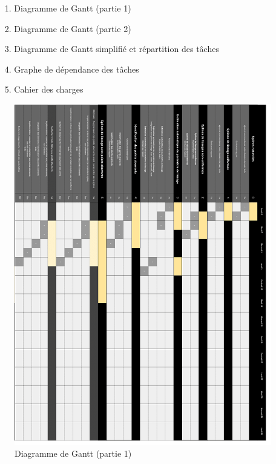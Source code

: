 \documentclass[a4paper,10pt]{article} %
\begin{document}
\begin{itemize}
\item[1.] Diagramme de Gantt (partie 1)
\item[2.] Diagramme de Gantt (partie 2)
\item[3.] Diagramme de Gantt simplifié et répartition des tâches
\item[4.] Graphe de dépendance des tâches
\item[5.] Cahier des charges
\end{itemize}
\begin{figure}
\begin{center}
\includegraphics[width=16cm]{p1.png} 
\end{center}
\caption{Diagramme de Gantt (partie 1)}
\label{DiagG1}
\end{figure}
\end{document}
